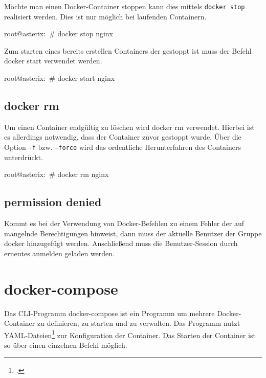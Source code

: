 Möchte man einen Docker-Container stoppen kann dies mittels \texttt{docker stop}
realisiert werden. Dies ist nur möglich bei laufenden Containern.

\begin{bashcode}
   root@asterix:~# docker stop nginx
\end{bashcode}

Zum starten eines bereits erstellen Containers der gestoppt ist muss der Befehl
docker start verwendet werden.

\begin{bashcode}
  root@asterix:~# docker start nginx
\end{bashcode}

\subsection{docker rm}%
\label{sec:docker-befehle.rm}

Um einen Container endgültig zu löschen wird docker rm verwendet. Hierbei ist es
allerdings notwendig, dass der Container zuvor gestoppt wurde. Über die Option
\texttt{-f} bzw. \texttt{--force} wird das ordentliche Herunterfahren des
Containers unterdrückt.

\begin{bashcode}
  root@asterix:~# docker rm nginx
\end{bashcode}

\subsection{permission denied}%
\label{sec:docker-befehle.permission_denied}

Kommt es bei der Verwendung von Docker-Befehlen zu einem Fehler der auf
mangelnde Berechtigungen hinweist, dann muss der aktuelle Benutzer der Gruppe
docker hinzugefügt werden. Anschließend muss die Benutzer-Session durch erneutes
anmelden geladen werden.



\section{docker-compose}%
\label{sec:docker-compose}

Das CLI-Programm docker-compose ist ein Programm um mehrere Docker-Container zu
definieren, zu starten und zu verwalten. Das Programm nutzt
YAML-Dateien\footcite{yaml} zur Konfiguration der Container. Das Starten der
Container ist so über einen einzelnen Befehl möglich.

